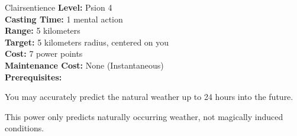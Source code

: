 {Clairsentience}
{
	\textbf{Level:}
	Psion 4\\
	\textbf{Casting Time:}
	1 mental action\\
	\textbf{Range:}
	5 kilometers\\
	\textbf{Target:}
	5 kilometers radius, centered on you\\
	\textbf{Cost:}
	7 power points\\
	\textbf{Maintenance Cost:}
	None (Instantaneous)\\
	\textbf{Prerequisites:}
	\\
}
{
	You may accurately predict the natural weather up to 24 hours into the future.

	This power only predicts naturally occurring weather, not magically induced conditions.
}
